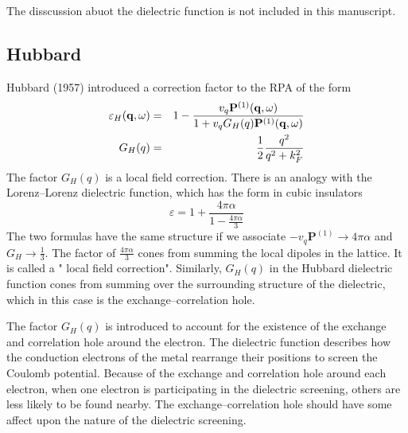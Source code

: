 The disscussion abuot the dielectric function is not included in this manuscript.

\subsection{Hubbard}
Hubbard (1957) introduced a correction factor to the RPA of the form
\begin{eqnarray}
    \varepsilon_H(\mathbf{q},\omega) &=& 1 - \frac{v_q \mathbf{P}^{(1)}(\mathbf{q},\omega)}{1 + v_q G_H(q) \mathbf{P}^{(1)}(\mathbf{q},\omega)}  \label{5.187} \\
    G_H(q) &=& \frac{1}{2} \frac{q^2}{q^2 + k_F^2} \label{5.188}
\end{eqnarray}
The factor $G_H(q)$ is a local field correction.
There is an analogy with the Lorenz--Lorenz dielectric function, which has the form in cubic insulators
\begin{equation}
    \varepsilon = 1 + \frac{4 \pi \alpha}{1 - \frac{4 \pi \alpha}{3} }  \label{5.189}
\end{equation}
The two formulas have the same structure if we associate $-v_q\mathbf{P}^{(1)} \to 4\pi \alpha$ and $G_H \to \frac{1}{3} $.
The factor of $ \frac{4\pi \alpha}{3} $ cones from summing the local dipoles in the lattice.
It is called a " local field correction".
Similarly, $G_H(q)$ in the Hubbard dielectric function cones from summing over the surrounding structure of the dielectric, which in this case is the exchange--correlation hole.

The factor $G_H(q)$ is introduced to account for the existence of the exchange and correlation hole around the electron.
The dielectric function describes how the conduction electrons of the metal rearrange their positions to screen the Coulomb potential.
Because of the exchange and correlation hole around each electron, when one electron is participating in the dielectric screening, others are less likely to be found nearby.
The exchange--correlation hole should have some affect upon the nature of the dielectric screening.

